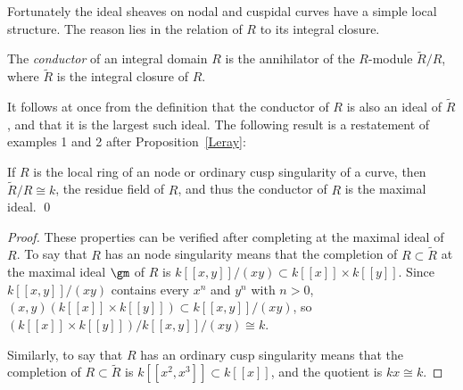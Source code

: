 %

Fortunately the ideal sheaves on nodal and cuspidal curves have a simple local structure. The reason lies in the relation of $R$ to its integral closure. 

\begin{definition}
The \emph{conductor} of an integral domain $R$ is the annihilator of the $R$-module
$\widetilde R/R$, where $\widetilde R$ is the integral closure of $R$.
\end{definition}

It follows at once from the definition that the conductor of $R$ is also an ideal of $\widetilde R$, and that it is the largest such ideal. The following result is a restatement of examples 1 and 2 after Proposition~\ref{Leray}:

\begin{proposition}\label{conductor of node and cusp}
If $R$ is the local ring of an node or ordinary cusp singularity of a curve, then  $\widetilde R/R \cong k$, the residue field of $R$, and thus the conductor of $R$ is the
maximal ideal. \qed
\end{proposition}

\begin{proof} These properties can be verified after completing at the maximal ideal of $R$.
To say that $R$ has an node singularity means that the completion of $R \subset \widetilde R$ at the maximal ideal $\gm$ of $R$ is $k[[x,y]]/(xy)\subset k[[x]]\times k[[y]]$. Since  $k[[x,y]]/(xy)$ contains every $x^n$ and $y^n$ with $n>0$,
$(x,y) (k[[x]]\times k[[y]]) \subset k[[x,y]]/(xy)$, so 
$(k[[x]]\times k[[y]])/ k[[x,y]]/(xy) \cong k$.

Similarly, to say that $R$ has an ordinary cusp singularity means that the completion of 
$R \subset \widetilde R$ is $k[[x^2,x^3]]\subset k[[x]]$, and the quotient is $kx \cong k$.
\end{proof}

